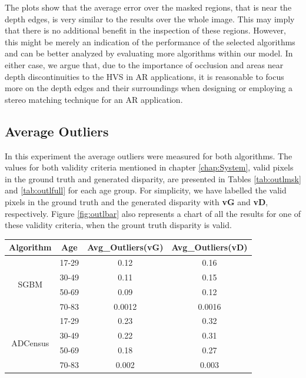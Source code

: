 The plots show that the average error over the masked regions, that is near the depth edges, is very similar to the results over the whole image. 
This may imply that there is no additional benefit in the inspection of these regions. 
However, this might be merely an indication of the performance of the selected algorithms and can be better analyzed by evaluating more algorithms 
within our model.
In either case, we argue that, due to the importance of occlusion and areas near depth discontinuities to the HVS in AR applications, 
it is reasonable to focus more on the depth edges and their surroundings when designing or employing a stereo matching technique for an AR application.

\subsection{Average Outliers}
In this experiment the average outliers were measured for both algorithms. 
The values for both validity criteria mentioned in chapter \ref{chap:System}, valid pixels in the ground truth and generated disparity, 
are presented in Tables \ref{tab:outlmsk} and \ref{tab:outlfull} for each age group. For simplicity, we have labelled the valid pixels
in the ground truth and the generated disparity with \textbf{vG} and \textbf{vD}, respectively.
Figure \ref{fig:outlbar} also represents a chart of all the results for one of these validity criteria, when the grount truth disparity is valid.

\begin{minipage}{0.8\linewidth}
\begin{center}
\label{tab:outlmsk}
\begin{tabular}{ |c|c|c|c| }
\hline
Algorithm & Age & Avg\_Outliers(vG) & Avg\_Outliers(vD) \\ \hline
\multirow{4}{*}{SGBM} & 17-29 & 0.12 & 0.16 \\
& 30-49 & 0.11 & 0.15 \\
& 50-69 & 0.09 & 0.12 \\
& 70-83 & 0.0012 & 0.0016 \\ \hline
\multirow{4}{*}{ADCensus} & 17-29 & 0.23 & 0.32 \\
& 30-49 & 0.22 & 0.31 \\
& 50-69 & 0.18 & 0.27 \\
& 70-83 & 0.002 & 0.003 \\ \hline
\end{tabular}
\end{center}
\end{minipage} \newline \newline

